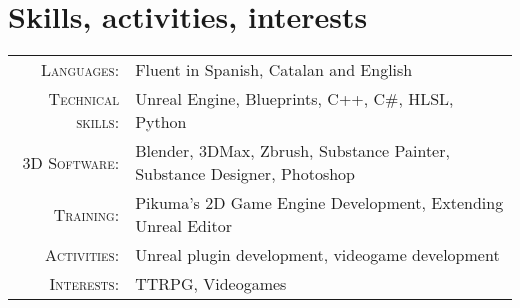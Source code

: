 \documentclass[a4paper,10pt]{article} %
\begin{document}

\section{Skills, activities, interests}

\begin{tabular}{rl}
\textsc{Languages}: & Fluent in Spanish, Catalan and English \\
\textsc{Technical skills}: & Unreal Engine, Blueprints, C++, C\#, HLSL, Python \\
\textsc{3D Software}: & Blender, 3DMax, Zbrush, Substance Painter, Substance Designer, Photoshop \\
\textsc{Training}: & Pikuma's 2D Game Engine Development, Extending Unreal Editor \\
\textsc{Activities}: & Unreal plugin development, videogame development \\
\textsc{Interests}: & TTRPG, Videogames \\
\end{tabular}
\end{document}

